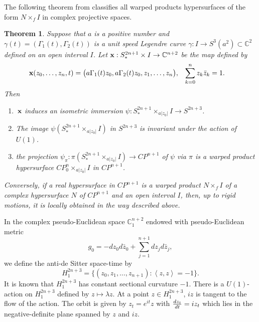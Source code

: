 \documentclass{amsart}
\theoremstyle{plain}
\newtheorem{theorem}{Theorem}[section]
\numberwithin{equation}{section}
\theoremstyle{remark}
\numberwithin{equation}{section}
\begin{document}
The following theorem from  \cite{c02-3} classifies all warped products hypersurfaces of the form $N\times_{f}I$ in complex projective spaces.

\begin{theorem}\label{T:13.3}   Suppose that $a$ is a
positive number and $\gamma(t)=(\Gamma_1(t),\Gamma_2(t))$ is a
unit speed Legendre curve $\gamma:I\to S^3(a^2)\subset{\mathbb C}^2$ defined on an open interval $I$.  Let $\hbox{\bf x}:S_*^{2n+1}\times I\to{\mathbb C}^{n+2}$ be the map defined by
\begin{align} &\hbox{\bf x}(z_0,\ldots,z_{n},t)=\big(a\Gamma_1(t)z_0,a\Gamma_2(t) z_0,z_1,\ldots,z_{n}\big),\;\;\;\sum_{k=0}^{n} z_k\bar z_k=1.\end{align} 
Then 
\begin{enumerate}
\item $\,\hbox{\bf x}$ induces an isometric immersion $\psi:S_*^{2n+1}\times_{a|z_0|} I\to S^{2n+3}$.

\item  The image $\psi(S_*^{2n+1}\times_{a|z_0|} I)$ in $S^{2n+3}$ is invariant under the action of $U(1)$.

\item the projection $\psi_\pi:\pi(S_*^{2n+1}\times_{a|z_0|} I) \to CP^{n+1}$ of $\psi$ via $\pi$ is a warped product hypersurface $CP^{n}_0\times_{a|z_0|} I$ in $CP^{n+1}$.
\end{enumerate}

Conversely, if a  real  hypersurface in $CP^{n+1}$ is a warped product $N\times_f I$ of a complex hypersurface $N$ of $CP^{n+1}$  and an open interval $I$, then, up to rigid motions, it is locally obtained in the way described above.
\end{theorem}

In the complex pseudo-Euclidean space ${\mathbb C}^{n+2}_1$ endowed with  pseudo-Euclidean metric
\begin{equation}g_0=-dz_0d\bar z_0 +\sum_{j=1}^{n+1}dz_jd\bar z_j,\end{equation} we  define the anti-de Sitter space-time  by
\begin{equation}H^{2n+3}_1=\big\{(z_0,z_1,\ldots,z_{n+1}):
\left<z,z\right>=-1\big\}.\end{equation} It is known that $H^{2n+3}_1$ has constant sectional curvature $-1$. There is a $U(1)$-action on
$H_1^{2n+3}$ defined by $z\mapsto \lambda z$. At a point $z\in H^{2n+3}_1$,  $iz$ is tangent to the flow of the action. The orbit is given by  $z_t=e^{it}z$ with ${{dz_t}\over{dt}}=iz_t$ which lies in the negative-definite plane spanned by $z$ and $iz$. 
\end{document}
